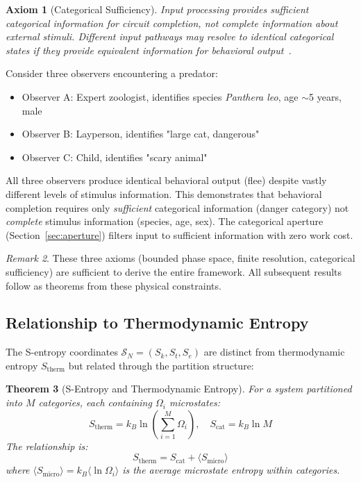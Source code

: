 \documentclass[aps,prd,twocolumn,superscriptaddress,floatfix,nofootinbib]{revtex4-2}
\newtheorem{theorem}{Theorem}[section]
\newtheorem{axiom}[theorem]{Axiom}
\theoremstyle{remark}
\newtheorem{remark}[theorem]{Remark}
\begin{document}
\begin{axiom}[Categorical Sufficiency]
\label{ax:sufficiency}
Input processing provides \emph{sufficient} categorical information for circuit completion, not \emph{complete} information about external stimuli. Different input pathways may resolve to identical categorical states if they provide equivalent information for behavioral output~\cite{friston2010free}.
\end{axiom}

\begin{justification}
Consider three observers encountering a predator:
\begin{itemize}
\item Observer A: Expert zoologist, identifies species \emph{Panthera leo}, age $\sim$5 years, male
\item Observer B: Layperson, identifies "large cat, dangerous"
\item Observer C: Child, identifies "scary animal"
\end{itemize}

All three observers produce identical behavioral output (flee) despite vastly different levels of stimulus information. This demonstrates that behavioral completion requires only \emph{sufficient} categorical information (danger category) not \emph{complete} stimulus information (species, age, sex). The categorical aperture (Section~\ref{sec:aperture}) filters input to sufficient information with zero work cost.
\end{justification}

\begin{remark}
These three axioms (bounded phase space, finite resolution, categorical sufficiency) are sufficient to derive the entire framework. All subsequent results follow as theorems from these physical constraints.
\end{remark}

\subsection{Relationship to Thermodynamic Entropy}

The S-entropy coordinates $\mathcal{S}_N = (S_k, S_t, S_e)$ are distinct from thermodynamic entropy $S_{\text{therm}}$ but related through the partition structure:

\begin{theorem}[S-Entropy and Thermodynamic Entropy]
\label{thm:entropy_relation}
For a system partitioned into $M$ categories, each containing $\Omega_i$ microstates:
$$
S_{\text{therm}} = k_B \ln \left(\sum_{i=1}^M \Omega_i\right), \quad S_{\text{cat}} = k_B \ln M
$$
The relationship is:
$$
S_{\text{therm}} = S_{\text{cat}} + \langle S_{\text{micro}} \rangle
$$
where $\langle S_{\text{micro}} \rangle = k_B \langle \ln \Omega_i \rangle$ is the average microstate entropy within categories.
\end{theorem}
\end{document}
